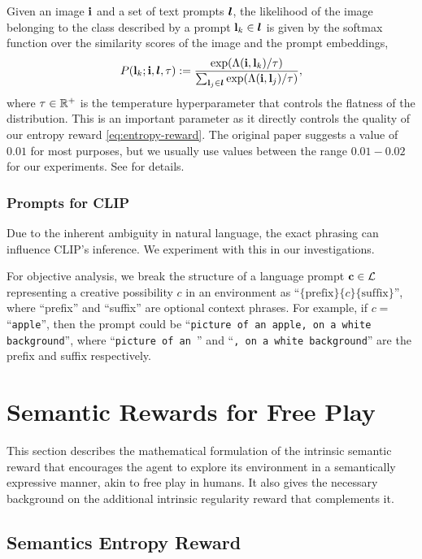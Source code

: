 Given an image \(\mathbf{i}\) and a set of text prompts \(\bm{l}\), the likelihood of the image belonging to the class described by a prompt \(\mathbf{l}_k \in \bm{l}\) is given by the softmax function over the similarity scores of the image and the prompt embeddings,
\begin{equation}
    \label{eq:clip-dist}
    P(\mathbf{l}_k; \mathbf{i}, \bm{l}, \tau) := \dfrac{\exp(\Lambda(\mathbf{i}, \mathbf{l}_k)/\tau)}{\sum_{\mathbf{l}_j \in \bm{l}} \exp(\Lambda(\mathbf{i}, \mathbf{l}_j)/\tau)},
\end{equation}
where \(\tau \in \mathbb{R}^+\) is the temperature hyperparameter that controls the flatness of the distribution.
This is an important parameter as it directly controls the quality of our entropy reward \eqref{eq:entropy-reward}.
The original paper suggests a value of \(0.01\) for most purposes, but we usually use values between the range \(0.01 - 0.02\) for our experiments.
See  for details.

\subsubsection{Prompts for CLIP}
\label{sec:prompt-engineering}
Due to the inherent ambiguity in natural language, the exact phrasing can influence CLIP's inference.
We experiment with this in our investigations.

For objective analysis, we break the structure of a language prompt \(\mathbf{c} \in \mathcal{L}\) representing a creative possibility \(c\) in an environment as ``\(\{\text{prefix}\}\{c\}\{\text{suffix}\}\)'', where ``prefix'' and ``suffix'' are optional context phrases. For example, if \(c =\) ``\texttt{apple}'', then the prompt could be ``\texttt{picture of an apple, on a white background}'', where ``\texttt{picture of an }'' and ``\texttt{, on a white background}'' are the prefix and suffix respectively.

\section{Semantic Rewards for Free Play}
\label{sec:semantics-reward}
This section describes the mathematical formulation of the intrinsic semantic reward that encourages the agent to explore its environment in a semantically expressive manner, akin to free play in humans.
It also gives the necessary background on the additional intrinsic regularity reward that complements it.

\subsection{Semantics Entropy Reward}
\label{sec:entropy-reward}

